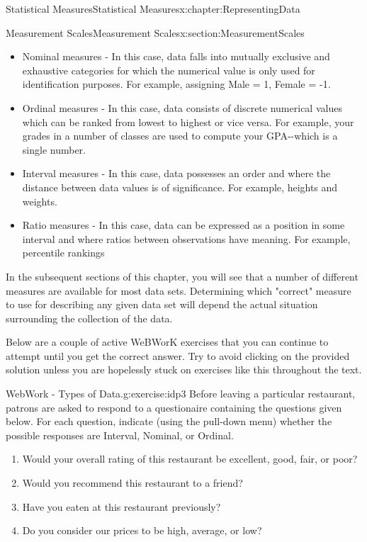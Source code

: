 \documentclass[oneside,10pt,]{book}
\numberwithin{equation}{section}
\begin{document}
\begin{chapterptx}{Statistical Measures}{}{Statistical Measures}{}{}{x:chapter:RepresentingData}
\begin{sectionptx}{Measurement Scales}{}{Measurement Scales}{}{}{x:section:MeasurementScales}
%
\begin{itemize}[label=\textbullet]
\item{}Nominal measures - In this case, data falls into mutually exclusive and exhaustive categories for which the numerical value is only used for identification purposes. For example, assigning Male = 1, Female = -1.%
\item{}Ordinal measures - In this case, data consists of discrete numerical values which can be ranked from lowest to highest or vice versa. For example, your grades in a number of classes are used to compute your GPA-{}-{}which is a single number.%
\item{}Interval measures - In this case, data possesses an order and where the distance between data values is of significance. For example, heights and weights.%
\item{}Ratio measures - In this case, data can be expressed as a position in some interval and where ratios between observations have meaning. For example, percentile rankings%
\end{itemize}
%
\par
In the subsequent sections of this chapter, you will see that a number of different measures are available for most data sets. Determining which "correct" measure to use for describing any given data set will depend the actual situation surrounding the collection of the data.%
\par
Below are a couple of active WeBWorK exercises that you can continue to attempt until you get the correct answer.  Try to avoid clicking on the provided solution unless you are hopelessly stuck on exercises like this throughout the text.%
\begin{inlineexercise}{WebWork - Types of Data.}{g:exercise:idp3}%
Before leaving a particular restaurant, patrons are asked to respond to a questionaire containing the questions given below.  For each question, indicate (using the pull-down menu) whether the possible responses are Interval, Nominal, or Ordinal.%
\par
%
\begin{enumerate}
\item{}Would your overall rating of this restaurant be excellent, good, fair, or poor?%
\item{}Would you recommend this restaurant to a friend?%
\item{}Have you eaten at this restaurant previously?%
\item{}Do you consider our prices to be high, average, or low?%
\end{enumerate}

\end{inlineexercise}
\end{sectionptx}
\end{chapterptx}
\end{document}
